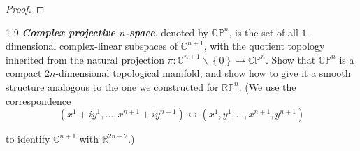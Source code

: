 \begin{proof}
\end{proof}

\begin{problem}{1-9}
    \textbf{\emph{Complex projective \( n \)-space}}, denoted by \( \mathbb{CP}^{n} \), is the set of all \( 1 \)-dimensional complex-linear subspaces of \( \mathbb{C}^{n+1} \), with the quotient topology inherited from the natural projection \( \pi: \mathbb{C}^{n+1} \smallsetminus \left\{0\right\} \to \mathbb{CP}^{n} \). Show that \( \mathbb{CP}^{n} \) is a compact \( 2n \)-dimensional topological manifold, and show how to give it a smooth structure analogous to the one we constructed for \( \mathbb{RP}^{n} \). (We use the correspondence
    \[
        (x^{1} + i y^{1}, \ldots, x^{n+1} + i y^{n+1}) \leftrightarrow (x^{1}, y^{1}, \ldots, x^{n+1}, y^{n+1})
    \]

    \noindent to identify \( \mathbb{C}^{n+1} \) with \( \mathbb{R}^{2n+2} \).)
\end{problem}

